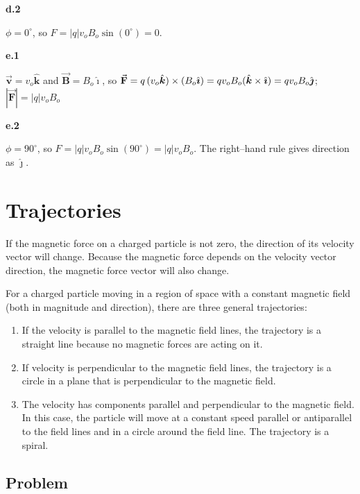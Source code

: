 \documentclass{article}
\newcommand{\ihat}[0]{\hat{\boldsymbol{\imath}}}
\newcommand{\jhat}[0]{\hat{\boldsymbol{\jmath}}}
\newcommand{\khat}[0]{\hat{\boldsymbol{k}}}
\newcommand{\bfvec}[1]{\vec{\mathbf{#1}}}
\begin{document}
{\bf d.2}

\ifsolutions
$\phi=0^{\circ}$, so $F = |q|v_oB_o\sin(0^{\circ})=0$.
\else

\vskip 48pt
\fi

{\bf e.1}

\ifsolutions
$\bfvec{v}=v_o\khat$ and $\bfvec{B}=B_o\ihat$, so $\bfvec{F} = q\thinspace (v_o\khat)\times (B_o\ihat)=qv_oB_o(\khat\times \ihat)=qv_oB_o\jhat$; $|\bfvec{F}|=|q|v_oB_o$
\else

\vskip 48pt
\fi

{\bf e.2}

\ifsolutions
$\phi=90^{\circ}$, so $F = |q|v_oB_o\sin(90^{\circ})=|q|v_oB_o$. The right--hand rule gives direction as $\jhat$.
\else

\newpage
\fi

\section{Trajectories}

If the magnetic force on a charged particle is not zero, the direction of its velocity vector will change. Because the magnetic force depends on the velocity vector direction, the magnetic force vector will also change.

For a charged particle moving in a region of space with a constant magnetic field (both in magnitude and direction), there are three general trajectories:

\begin{enumerate}

  \item If the velocity is parallel to the magnetic field lines, the trajectory is a straight line because no magnetic forces are acting on it.

  \item If velocity is perpendicular to the magnetic field lines, the trajectory is a circle in a plane that is perpendicular to the magnetic field.

  \item The velocity has components parallel and perpendicular to the magnetic field. In this case, the particle will move at a constant speed parallel or antiparallel to the field lines and in a circle around the field line. The trajectory is a spiral.

\end{enumerate}

\subsection{Problem}
\end{document}
